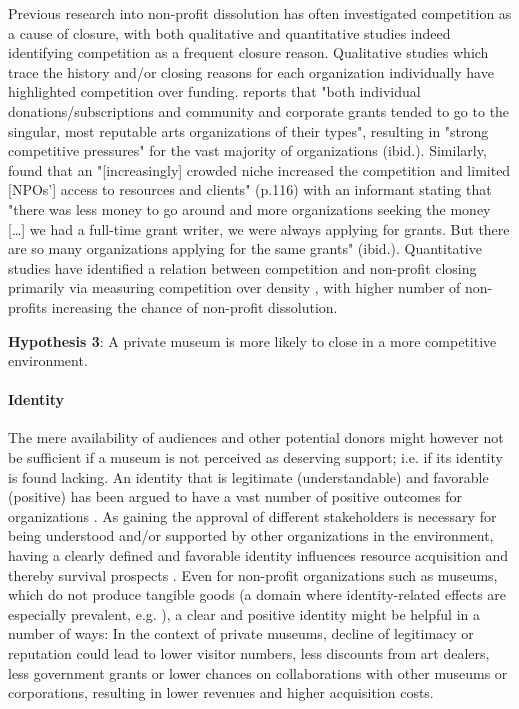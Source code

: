 \documentclass[12pt]{article}
\begin{document}
Previous research into non-profit dissolution has often investigated competition as a cause of closure, with both qualitative and quantitative studies indeed identifying competition as a frequent closure reason.
Qualitative studies which trace the history and/or closing reasons for each organization individually have highlighted competition over funding.
\textcite{Hager_1999_demise} reports that "both individual donations/subscriptions and community and corporate grants tended to go to the singular, most reputable arts organizations of their types", resulting in "strong competitive pressures" for the vast majority of organizations (ibid.).
Similarly, \textcite{HernandezOrtiz_2022_discontinuity} found that an "[increasingly] crowded niche increased the competition and limited [NPOs'] access to resources and clients" (p.116) with an informant stating that "there was less money to go around and more organizations seeking the money [\ldots{}] we had a full-time grant writer, we were always applying for grants. But there are so many organizations applying for the same grants" (ibid.).
Quantitative studies have identified a relation between competition and non-profit closing primarily via measuring competition over density \parencite{Park_Shon_Lu_2021_mortality,Haugh_etal_2021_nascent,Lu_Shon_Zhang_2019_dissolution}, with higher number of non-profits increasing the chance of non-profit dissolution.



\textbf{Hypothesis 3}: A private museum is more likely to close in a more competitive environment.
\paragraph*{Identity}

The mere availability of audiences and other potential donors might however not be sufficient if a museum is not perceived as deserving support; i.e. if its identity is found lacking. 
An identity that is legitimate (understandable) and favorable (positive) has been argued to have a vast number of positive outcomes for organizations \parencite{Lange_Lee_Dai_2010_reputation}.
As gaining the approval of different stakeholders is necessary for being understood and/or supported by other organizations in the environment, having a clearly defined and favorable identity influences resource acquisition and thereby survival prospects \parencite{Rao_1994_reputation}.
Even for non-profit organizations such as museums, which do not produce tangible goods (a domain where identity-related effects are especially prevalent, e.g. \cite{Hsu_2015_granted,Bogaert_etal_2014_ecological}), a clear and positive identity might be helpful in a number of ways:
In the context of private museums, decline of legitimacy or reputation could lead to lower visitor numbers, less discounts from art dealers, less government grants or lower chances on collaborations with other museums or corporations, resulting in lower revenues and higher acquisition costs.
\end{document}
